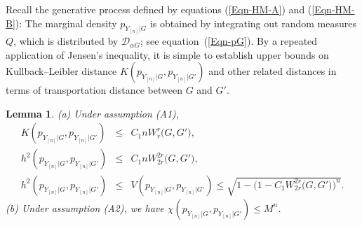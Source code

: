 \documentclass[MSNbibl,number,citesort]{arxbj}
\newcommand{\eqref}[1]{(\ref{#1})}
\newtheorem{lemma}{Lemma}[section]
\newcommand{\DP}{\mathscr{D}}
\newcommand{\Wr}{W_r}
\begin{document}
Recall the generative process defined by equations \eqref{Eqn-HM-A}
and \eqref{Eqn-HM-B}: The marginal density $
{p_{Y_{[n]}|G}}$ is obtained
by integrating out random measures $Q$, which is distributed
by $\DP_{\alpha G}$; see equation~\eqref{Eqn-pG}.
By a repeated application of Jensen's inequality,
it is simple to establish upper bounds on Kullback--Leibler distance
$K({p_{Y_{[n]}|G}},{p_{Y_{[n]}|G'}})$ and other
related distances in terms of transportation distance
between $G$ and $G'$.

%
\begin{lemma}
\label{Lem-W-ub}
\textup{(a)} Under assumption \textup{(A1)},
%
\begin{eqnarray*}
K({p_{Y_{[n]}|G}},{p_{Y_{[n]}|G'}}) & \leq&
C_1 n \Wr^r \bigl(G,G' \bigr),
\\
h^2({p_{Y_{[n]}|G}},{p_{Y_{[n]}|G'}}) &
\leq& C_1 n W_{2r}^{2r} \bigl(G,G'
\bigr),
\\
h^2({p_{Y_{[n]}|G}},{p_{Y_{[n]}|G'}}) &
\leq& V({p_{Y_{[n]}|G}},{p_{Y_{[n]}|G'}}) \leq \sqrt
{1 - \bigl(1- C_1 W_{2r}^{2r}
\bigl(G,G' \bigr) \bigr)^n}.
\end{eqnarray*}
%
\textup{(b)} Under assumption \textup{(A2)}, we have $\chi(
{p_{Y_{[n]}|G}},{p_{Y_{[n]}|G'}}) \leq M^n$.
\end{lemma}
\end{document}

